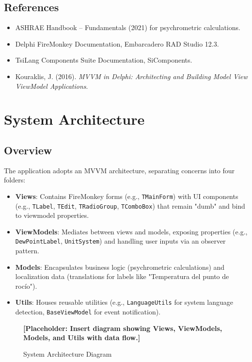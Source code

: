 \documentclass[12pt,a4paper]{article}
\begin{document}
	\subsection{References}
	\begin{itemize}
		\item ASHRAE Handbook – Fundamentals (2021) for psychrometric calculations.
		\item Delphi FireMonkey Documentation, Embarcadero RAD Studio 12.3.
		\item TsiLang Components Suite Documentation, SiComponents.
		\item Kouraklis, J. (2016). \textit{MVVM in Delphi: Architecting and Building Model View ViewModel Applications}.
	\end{itemize}
	
	\section{System Architecture}
	\subsection{Overview}
	The application adopts an MVVM architecture, separating concerns into four folders:
	\begin{itemize}
		\item \textbf{Views}: Contains FireMonkey forms (e.g., \texttt{TMainForm}) with UI components (e.g., \texttt{TLabel}, \texttt{TEdit}, \texttt{TRadioGroup}, \texttt{TComboBox}) that remain "dumb" and bind to viewmodel properties.
		\item \textbf{ViewModels}: Mediates between views and models, exposing properties (e.g., \texttt{DewPointLabel}, \texttt{UnitSystem}) and handling user inputs via an observer pattern.
		\item \textbf{Models}: Encapsulates business logic (psychrometric calculations) and localization data (translations for labels like "Temperatura del punto de rocío").
		\item \textbf{Utils}: Houses reusable utilities (e.g., \texttt{LanguageUtils} for system language detection, \texttt{BaseViewModel} for event notification).
	\end{itemize}
	\begin{figure}[h]
		\centering
		\caption{System Architecture Diagram}
		\textbf{[Placeholder: Insert diagram showing Views, ViewModels, Models, and Utils with data flow.]}
	\end{figure}
	
\end{document}
